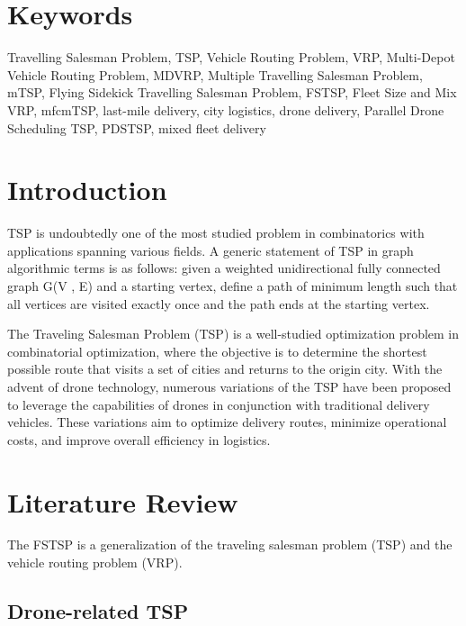 \documentclass[twocolumn]{article}
\begin{document}
	\section*{Keywords}
	Travelling Salesman Problem, TSP, Vehicle Routing Problem, VRP, Multi-Depot Vehicle Routing Problem, MDVRP, Multiple Travelling Salesman Problem, mTSP, Flying Sidekick Travelling Salesman Problem, FSTSP, Fleet Size and Mix VRP, mfcmTSP, last-mile delivery, city logistics, drone delivery, Parallel Drone Scheduling TSP, PDSTSP, mixed fleet delivery
	
	\section{Introduction}
	TSP is undoubtedly one of the most studied problem in combinatorics with applications spanning various fields. A generic statement of TSP in graph algorithmic terms is as follows: given a weighted unidirectional fully connected graph G(V , E) and a starting vertex, define a path of minimum length such that all vertices are visited exactly once and the path ends at the starting vertex.
	
	The Traveling Salesman Problem (TSP) is a well-studied optimization problem in combinatorial optimization, where the objective is to determine the shortest possible route that visits a set of cities and returns to the origin city. With the advent of drone technology, numerous variations of the TSP have been proposed to leverage the capabilities of drones in conjunction with traditional delivery vehicles. These variations aim to optimize delivery routes, minimize operational costs, and improve overall efficiency in logistics.
	\section{Literature Review}
	The FSTSP is a generalization of the traveling salesman problem (TSP) and the vehicle routing problem (VRP).
	\subsection{Drone-related TSP}
\end{document}
